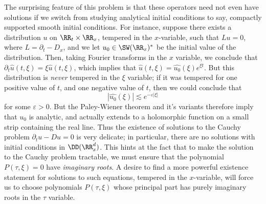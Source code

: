 The surprising feature of this problem is that these operators need not even have solutions if we switch from studying analytical initial conditions to say, compactly supported smooth initial conditions. For instance, suppose there exists a distribution $u$ on $\RR_t \times \RR_x$, tempered in the $x$-variable, such that $Lu = 0$, where $L = \partial_t - D_x$, and we let $u_0 \in \SW(\RR_x)^*$ be the initial value of the distribution. Then, taking Fourier transforms in the $x$ variable, we conclude that $\partial_t \widehat{u}(t,\xi) = \xi \widehat{u}(t,\xi)$, which implies that $\widehat{u}(t,\xi) = \widehat{u_0}(\xi) e^{\xi t}$. But this distribution is \emph{never} tempered in the $\xi$ variable; if it was tempered for one positive value of $t$, and one negative value of $t$, then we could conclude that
%
\[ |\widehat{u_0}(\xi)| \lesssim e^{- \varepsilon |\xi|} \]
%
for some $\varepsilon > 0$. But the Paley-Wiener theorem and it's variants therefore imply that $u_0$ is analytic, and actually extends to a holomorphic function on a small strip containing the real line. Thus the existence of solutions to the Cauchy problem $\partial_t u - Du = 0$ is very delicate; in particular, there are no solutions with initial conditions in $\DD(\RR^d_x)$. This hints at the fact that to make the solution to the Cauchy problem tractable, we must ensure that the polynomial $P(\tau,\xi) = 0$ have \emph{imaginary roots}. A desire to find a more powerful existence statement for solutions to such equations, tempered in the $x$-variable, will force us to choose polynomials $P(\tau,\xi)$ whose principal part has purely imaginary roots in the $\tau$ variable.

%
%
%
%

